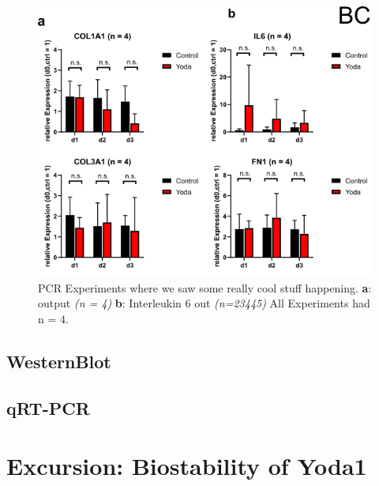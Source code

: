 \begin{figure}[ht]
    \centering
    \includegraphics[scale = 0.6]{Collection.png}
    \caption{
    PCR Experiments where we saw some really cool stuff happening. 
    \textbf{a}: \colone output \textit{(n = 4)}
    \textbf{b}: Interleukin 6 out \textit{(n=23445)}
    All Experiments had n = 4. 
    }
    \label{fig:my_label}
\end{figure}

\subsection{WesternBlot}

\subsection{qRT-PCR}

\section{Excursion: Biostability of Yoda1}
\label{sec:biostability}